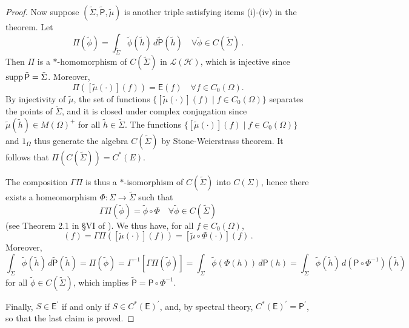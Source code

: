 \documentclass[12pt]{amsart}
\theoremstyle{definition}
\newcommand{\lh}{\mathcal{L(H)}} %
\newcommand{\Eo}{\mathsf{E}} %
\newcommand{\PP}{\mathsf{P}} %
\newcommand{\supp}{{\rm supp}\,}
\newcommand{\de}{\, d}
\newcommand{\frecc}{\rightarrow}
\begin{document}
\begin{proof}
Now suppose $( \tilde{\Sigma},\tilde{\PP},\tilde{\mu} )$ is another triple
satisfying items {\rm (i)-(iv)} in the theorem. Let
\begin{equation*}
\Pi (\tilde{\phi}) = \int_{\tilde{\Sigma}} \tilde{\phi} (\tilde{h}) \de \tilde{\PP} (\tilde{h})
\quad \forall \tilde{\phi} \in C(\tilde{\Sigma}) \, .
\end{equation*}
Then $\Pi$ is a $\ast$-homomorphism of $C(\tilde{\Sigma})$ in $\lh$, which is injective
since $\supp \tilde{\PP} = \tilde{\Sigma}$. Moreover,
\begin{equation*}
\Pi \left( [\tilde{\mu} (\cdot)] (f) \right) = \Eo(f) \quad \forall f\in C_0 (\Omega) .
\end{equation*}
By injectivity of $\tilde{\mu}$, the set of functions $\{ [\tilde{\mu} (\cdot)] (f) \mid f\in C_0 (\Omega) \}$ separates the points of $\tilde{\Sigma}$, and it is closed under complex conjugation since
$\tilde{\mu} (\tilde{h}) \in M(\Omega)^+$ for all $\tilde{h} \in \tilde{\Sigma}$. The functions $\{ [\tilde{\mu} (\cdot)] (f) \mid f\in C_0 (\Omega) \}$ and $1_{\Omega}$ thus generate the algebra $C(\tilde{\Sigma})$ by Stone-Weierstrass theorem. It follows that $\Pi ( C(\tilde{\Sigma}) ) = C^\ast (E)$.

The composition $\Gamma \Pi$ is thus a $\ast$-isomorphism of $C(\tilde{\Sigma})$
into $C(\Sigma)$, hence there exists a homeomorphism $\Phi : \Sigma \frecc \tilde{\Sigma}$
such that
\begin{equation*}
\Gamma \Pi (\tilde{\phi}) = \tilde{\phi} \circ \Phi \quad \forall \tilde{\phi} \in C(\tilde{\Sigma})
\end{equation*}
(see Theorem 2.1 in \S VI of \cite{CFA90}). We thus have, for all $f\in C_0 (\Omega)$,
\begin{equation*}
[\mu(\cdot)] (f) = \Gamma \Pi \left( [\tilde{\mu} (\cdot)] (f) \right) =
[\tilde{\mu} \circ \Phi (\cdot)] (f) \, .
\end{equation*}
Moreover,
\begin{equation*}
\int_{\tilde{\Sigma}} \tilde{\phi} (\tilde{h}) \de \tilde{\PP} (\tilde{h}) = \Pi (\tilde{\phi}) = \Gamma^{-1} \left[ \Gamma \Pi (\tilde{\phi}) \right] = \int_{\Sigma} \tilde{\phi} (\Phi(h)) \de \PP (h) = \int_{\tilde{\Sigma}} \tilde{\phi} (\tilde{h}) \de (\PP \circ \Phi^{-1}) (\tilde{h})
\end{equation*}
for all $\tilde{\phi} \in C(\tilde{\Sigma})$, which implies $\tilde{\PP} = \PP \circ \Phi^{-1}$.

Finally, $S\in\Eo^\prime$ if and only if $S\in C^\ast (\Eo)^\prime$, and, by spectral theory, $C^\ast (\Eo)^\prime = \PP^\prime$, so that the last claim is proved.
\end{proof}
\end{document}

